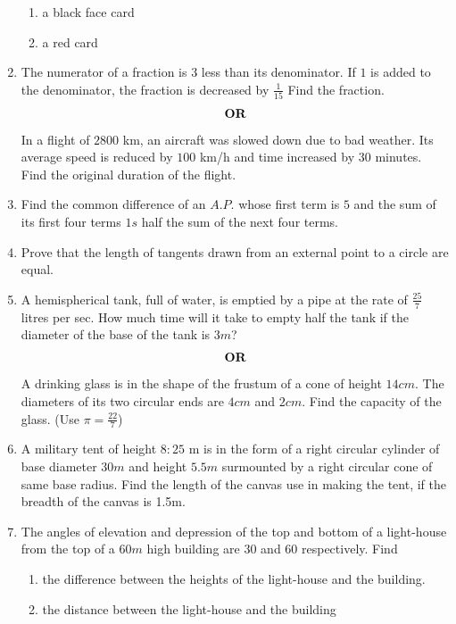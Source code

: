 \documentclass[journal,12pt,twocolumn]{IEEEtran}
\renewcommand\thesection{\arabic{section}}
\begin{document}
\begin{enumerate}[label=\thesection.\arabic*.,ref=\thesection.\theenumi]
\begin{enumerate}
    \item a black face card
    \item a red card\\
 \end{enumerate}
\item The numerator of a fraction is $3$ less than its denominator. If $1$ is added to the denominator, the fraction is decreased by $\frac{1}{15}$ Find the fraction.
\begin{align}
    \centering \vec{OR}\nonumber
\end{align}
In a flight of $2800$ km, an aircraft was slowed down due to bad
weather. Its average speed is reduced by $100$ km/h and time
increased by $30$ minutes. Find the original duration of the flight.\\
\item Find the common difference of an $A.P$. whose first term is $5$ and the sum of its first four terms $1s$ half the sum of the next four terms.\\
\item Prove that the length of tangents drawn from an external point to a circle are equal.\\
\item A hemispherical tank, full of water, is emptied by a pipe at the rate of $\frac{25}{7}$ litres per sec. How much time will it take to empty half the tank if the diameter of the base of the tank is $3m$?\\
\begin{align}
    \centering \vec{OR}\nonumber
\end{align}
A drinking glass is in the shape of the frustum of a cone of height $14cm$. The diameters of its two circular ends are $4cm$ and $2cm$. Find the capacity of the glass. (Use $\pi = \frac{22}{7}$)\\
\item A military tent of height $8:25$ m is in the form of a right circular cylinder of base diameter $30m$ and height $5.5m$ surmounted by a right circular cone of same base radius. Find the length of the canvas use in making the tent, if the breadth of the canvas is 1.5m.\\
\item The angles of elevation and depression of the top and bottom of a light-house from the top of a $60m$ high building are $30$ and $60$ respectively. Find
 \begin{enumerate}
  \item the difference between the heights of the light-house and the building.
  \item the distance between the light-house and the building
 \end{enumerate}
\end{enumerate}
\end{document}
